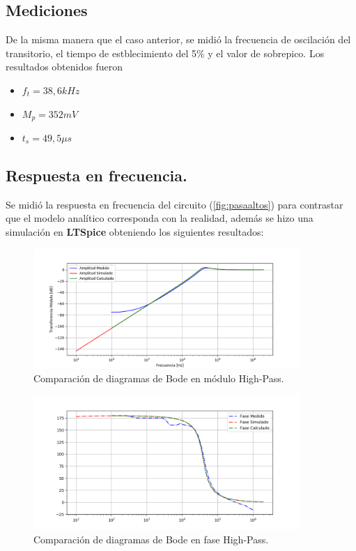 \subsection{Mediciones}
De la misma manera que el caso anterior, se midió la frecuencia de oscilación del transitorio, el tiempo de estblecimiento del 5\% y el valor de sobrepico. Los resultados obtenidos fueron
\begin{itemize}
    \item $f_t=38,6 kHz$
    \item $M_p=352 mV $
    \item $t_s=49,5 \mu s$
\end{itemize}

\subsection{Respuesta en frecuencia.}
Se midió la respuesta en frecuencia del circuito (\ref{fig:pasaaltos}) para contrastar que el modelo analítico corresponda con la realidad, además se hizo una simulación en \textbf{LTSpice} obteniendo los siguientes resultados:
\begin{figure}[H]
	\centering
	\includegraphics[width=0.9\textwidth]{Bodes_Labo/Fotos/HP.png}
\caption{Comparación de diagramas de Bode en módulo High-Pass.}
	\label{fig:BODEHP}
\end{figure}

\begin{figure}[H]
	\centering
	\includegraphics[width=0.9\textwidth]{Bodes_Labo/Fotos/HPP.png}
\caption{Comparación de diagramas de Bode en fase High-Pass.}
	\label{fig:BODEHPP}
\end{figure}
